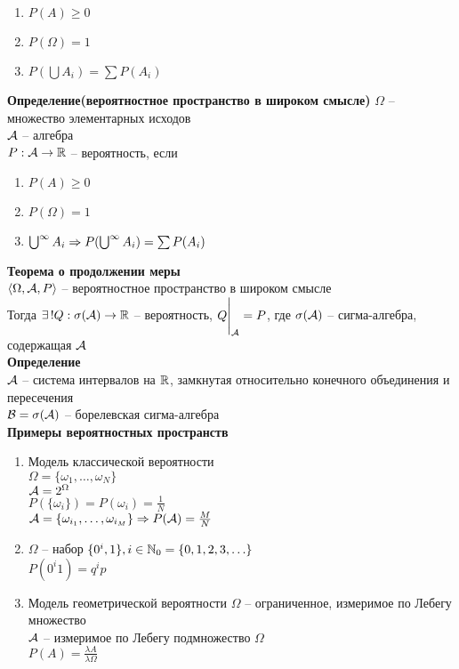 \documentclass[12pt]{article}
\begin{document}
\begin{enumerate}
    \item $P(A) \geq 0$
    \item $P(\Omega) = 1$
    \item $P(\bigcup A_i) = \sum P(A_i)$
\end{enumerate} 
\textbf{Определение(вероятностное пространство в широком смысле)}
$\Omega$ -- множество элементарных исходов\\
$\mathcal{A}$ -- алгебра\\
$P: \mathcal{A} \rightarrow \mathbb{R}$ -- вероятность, если
\begin{enumerate}
    \item $P(A) \geq 0$
    \item $P(\Omega) = 1$
    \item $\bigcup^\infty A_i \Rightarrow P(\bigcup^\infty A_i) = \sum P(A_i)$
\end{enumerate}
\textbf{Теорема о продолжении меры}\\
$\langle \Omega, \mathcal{A}, P\rangle$ -- вероятностное пространство в широком смысле\\
Тогда $\exists\,! Q: \sigma(\mathcal{A}) \rightarrow \mathbb{R}$ -- вероятность, $Q\Biggr|_{\mathcal{A}} = P$, где $\sigma(\mathcal{A})$ -- сигма-алгебра, содержащая $\mathcal{A}$\\
\textbf{Определение}\\
$\mathcal{A}$ -- система интервалов на $\mathbb{R}$, замкнутая относительно конечного объединения и пересечения\\
$\mathcal{B} = \sigma(\mathcal{A})$ -- борелевская сигма-алгебра\\
\textbf{Примеры вероятностных пространств}
\begin{enumerate}
    \item Модель классической вероятности\\
    $\Omega = \{\omega_1, \ldots, \omega_N\}$\\
    $\mathcal{A} = 2^\Omega$\\
    $P(\{\omega_i\}) = P(\omega_i) = \frac1N$\\
    $\mathcal{A} = \{\omega_{i_1}, \ldots, \omega_{i_M}\} \Rightarrow P(\mathcal{A}) = \frac{M}{N}$
    \item $\Omega$ -- набор $\{0^i, 1\}, i \in \mathbb{N}_0 = \{0, 1, 2, 3, \ldots\}$\\
    $P(0^i1)=q^ip$
    \item Модель геометрической вероятности
    $\Omega$ -- ограниченное, измеримое по Лебегу множество\\
    $\mathcal{A}$ -- измеримое по Лебегу подмножество $\Omega$\\
    $P(A) = \frac{\lambda A}{\lambda \Omega}$
\end{enumerate}
\end{document}
